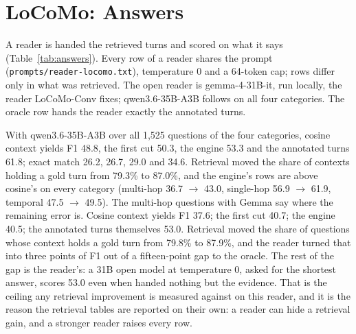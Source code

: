 \documentclass[11pt]{article}
\begin{document}
\section{LoCoMo: Answers}
\label{sec:answers}

A reader is handed the retrieved turns and scored on what it says
(Table~\ref{tab:answers}). Every row of a reader shares the prompt
(\texttt{prompts/reader-locomo.txt}), temperature 0 and a 64-token cap; rows
differ only in what was retrieved. The open reader is gemma-4-31B-it, run
locally, the reader LoCoMo-Conv fixes; qwen3.6-35B-A3B follows on all four
categories. The oracle row hands the reader exactly the annotated turns.

With qwen3.6-35B-A3B over all 1,525 questions of the four categories,
cosine context yields F1 48.8, the first cut 50.3, the engine 53.3 and the
annotated turns 61.8; exact match 26.2, 26.7, 29.0 and 34.6. Retrieval moved
the share of contexts holding a gold turn from 79.3\% to 87.0\%, and the
engine's rows are above cosine's on every category (multi-hop 36.7
$\rightarrow$ 43.0, single-hop 56.9 $\rightarrow$ 61.9, temporal 47.5
$\rightarrow$ 49.5). The multi-hop questions with Gemma say where the remaining error is. Cosine
context yields F1 37.6; the first cut 40.7; the engine 40.5; the annotated
turns themselves 53.0. Retrieval moved the share of questions whose context
holds a gold turn from 79.8\% to 87.9\%, and the reader turned that into
three points of F1 out of a fifteen-point gap to the oracle. The rest of the
gap is the reader's: a 31B open model at temperature 0, asked for the
shortest answer, scores 53.0 even when handed nothing but the evidence.
That is the ceiling any retrieval improvement is measured against on this
reader, and it is the reason the retrieval tables are reported on their own:
a reader can hide a retrieval gain, and a stronger reader raises every row.

\begin{table}[t]
\centering
\footnotesize
\resizebox{\textwidth}{!}{}
\caption{Answer accuracy on LoCoMo with the same reader, prompt and $k$
across rows, all ten conversations. EXACT is the share of questions whose
context held an annotated turn; ANSWERED is F1 $\geq 0.5$ or an exact match.
The oracle row hands the reader exactly the annotated turns and bounds what
retrieval can still buy. Tokens per question are the retrieved context
delivered to the reader; the reader's own p50 latency is the local Ollama
service under shared load and is reported, not claimed.}
\label{tab:answers}
\end{table}
\end{document}
